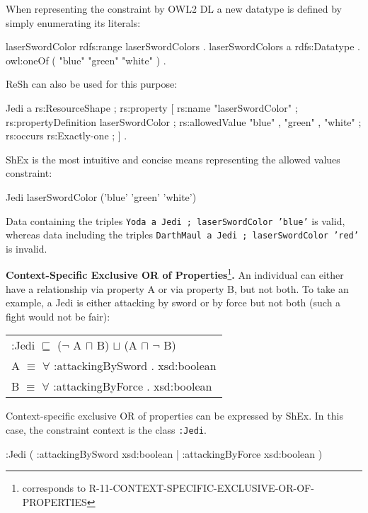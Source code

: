 \documentclass{llncs}
\newcommand{\ms}[1]{\texttt{#1}}
\newenvironment{DL}{
  \scriptsize
  \sffamily
  \vspace{0.3cm}
  \begin{tabular}{l}

}{
  \end{tabular}
  \linebreak
}
\begin{document}
When representing the constraint by OWL2 DL a new datatype is defined by simply enumerating its literals:

\begin{ex}
laserSwordColor rdfs:range laserSwordColors . 
laserSwordColors
    a rdfs:Datatype .
    owl:oneOf ( "blue" "green" "white" ) .
\end{ex}

ReSh can also be used for this purpose:

\begin{ex}
Jedi a rs:ResourceShape ;
    rs:property [
        rs:name "laserSwordColor" ;
        rs:propertyDefinition laserSwordColor ;
        rs:allowedValue "blue" , "green" , "white" ;
        rs:occurs rs:Exactly-one ;
    ] .
\end{ex}

ShEx is the most intuitive and concise means representing the allowed values constraint:

\begin{ex}
Jedi {
    laserSwordColor ('blue' 'green' 'white') }
\end{ex}

Data containing the triples \ms{Yoda a Jedi ; laserSwordColor 'blue'} is valid, 
whereas data including the triples \ms{DarthMaul a Jedi ; laserSwordColor 'red'} is invalid.

\textbf{Context-Specific Exclusive OR of Properties}\footnote{corresponds to  R-11-CONTEXT-SPECIFIC-EXCLUSIVE-OR-OF-PROPERTIES}\textbf{.}
An individual can either have a relationship via property A or via property B, but not both.
To take an example, a Jedi is either attacking by sword or by force but not both (such a fight would not be fair):

\begin{DL}
:Jedi $\sqsubseteq$ ($\neg$ A $\sqcap$ B) $\sqcup$ (A $\sqcap$ $\neg$ B) \\
A $\equiv$ $\forall$ :attackingBySword . xsd:boolean \\
B $\equiv$ $\forall$ :attackingByForce . xsd:boolean \\ 
\end{DL}

Context-specific exclusive OR of properties can be expressed by ShEx. 
In this case, the constraint context is the class \ms{:Jedi}.

\begin{ex}
:Jedi { (  
    :attackingBySword xsd:boolean | 
    :attackingByForce xsd:boolean ) }
\end{ex}
\end{document}
